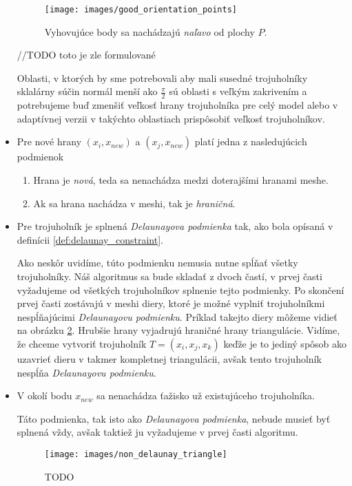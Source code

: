 \begin{itemize}
{        \begin{figure}
            \centerline{\texttt{[image: images/good\_orientation\_points]}}
            \caption[]{Vyhovujúce body sa nachádzajú \textit{naľavo} od plochy $P$.}
            \label{obr:good_orientation_points}
        \end{figure}


        //TODO toto je zle formulované

        Oblasti, v ktorých by sme potrebovali aby mali susedné trojuholníky sklalárny súčin normál menší ako 
        $\frac{\pi}{2}$ sú oblasti s veľkým zakrivením a potrebujeme buď zmenšiť veľkosť hrany trojuholníka
        pre celý model alebo v adaptívnej verzii v takýchto oblastiach prispôsobiť veľkosť trojuholníkov. 
    }

     \item{
         Pre nové hrany $(x_i, x_{new})$ a $(x_j, x_{new})$ platí jedna z nasledujúcich podmienok
         \begin{enumerate}
            \item {
                Hrana je \textit{nová}, teda sa nenachádza medzi doterajšími hranami meshe. 
            }
            \item {
                Ak sa hrana nachádza v meshi, tak je \textit{hraničná}.
            }
         \end{enumerate}
     }

     \item{
         Pre trojuholník je splnená \textit{Delaunayova podmienka} tak, ako bola opísaná v 
         definícii \ref{def:delaunay_constraint}.

        Ako neskôr uvidíme, túto podmienku nemusia nutne spĺňať všetky trojuholníky. Náš algoritmus sa bude 
        skladať z dvoch častí, v prvej časti vyžadujeme od všetkých trojuholníkov splnenie tejto podmienky.
        Po skončení prvej časti zostávajú v meshi diery, ktoré je možné vyplniť trojuholníkmi nespĺňajúcimi 
        \textit{Delaunayovu podmienku}. Príklad takejto diery môžeme vidieť na obrázku 
        \ref{obr:non_delaunay_triangle}. Hrubšie hrany vyjadrujú hraničné hrany triangulácie. 
        Vidíme, že chceme vytvoriť trojuholník $T = (x_i, x_j, x_k)$
        keďže je to jediný spôsob ako uzavrieť dieru v takmer kompletnej triangulácii,
        avšak tento trojuholník nespĺňa \textit{Delaunayovu podmienku}.
     }

     \item{
         V okolí bodu $x_{new}$ sa nenachádza ťažisko už existujúceho trojuholníka.

         Táto podmienka, tak isto ako \textit{Delaunayova podmienka}, nebude musieť byť splnená vždy,
         avšak taktiež ju vyžadujeme v prvej časti algoritmu.
     }
    \begin{figure}
        \centerline{\texttt{[image: images/non\_delaunay\_triangle]}}
        \caption[]{TODO}
        \label{obr:non_delaunay_triangle}
    \end{figure}
\end{itemize}

